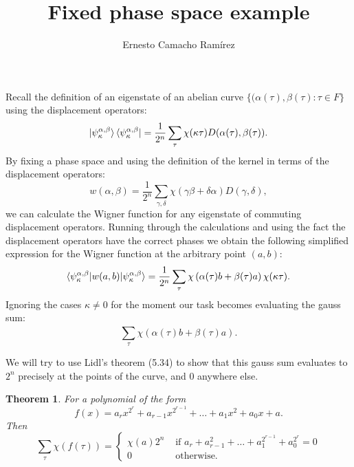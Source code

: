 \documentclass[a4paper]{article}
\title{Fixed phase space example}
\author{Ernesto Camacho Ramírez}
\newtheorem{theorem}{Theorem}
\begin{document}
  \maketitle

  Recall the definition of an eigenstate of an abelian curve
  $\{(\alpha(\tau),\beta(\tau) : \tau \in F\}$ using the
  displacement operators:
  \begin{equation}
    \ket{\psi_\kappa^{\alpha,\beta}}
    \bra{\psi_\kappa^{\alpha,\beta}}
    = \frac{1}{2^{n}}
    \sum_{\tau}^{} \chi(\kappa\tau) 
    D(\alpha(\tau),\beta(\tau)).
  \end{equation}
  By fixing a phase space and using the definition of the
  kernel in terms of the displacement operators:
  \begin{equation}
    w(\alpha,\beta)
    = \frac{1}{2^{n}} \sum_{\gamma,\delta}^{} 
    \chi(\gamma\beta +\delta\alpha) D(\gamma,\delta),
  \end{equation}
  we can calculate the Wigner function for any eigenstate of
  commuting displacement operators.
  Running through the calculations and using the fact the
  displacement operators have the correct phases we obtain
  the following simplified expression for the Wigner
  function at the arbitrary point $(a,b)$:
  \begin{equation}
    \braket{
      \psi_{\kappa}^{\alpha,\beta}|w(a,b)|
      \psi_{\kappa}^{\alpha,\beta}
    }
    = \frac{1}{2^{n}}
    \sum_{\tau}^{} 
    \chi\left( \alpha(\tau)b + \beta(\tau)a \right) 
    \chi(\kappa\tau).
  \end{equation}
  Ignoring the cases $\kappa \neq 0$ for the moment our task
  becomes evaluating the gauss sum:
  \begin{equation}
    \sum_{\tau}^{} 
    \chi\left( \alpha(\tau)b + \beta(\tau)a \right).
  \end{equation}

  We will try to use Lidl's theorem (5.34) to show that this
  gauss sum evaluates to $2^{n}$ precisely at the points of
  the curve, and 0 anywhere else.

  \begin{theorem}
    For a polynomial of the form
    \begin{equation}
      f(x)
      = a_r x^{2^{r}} + a_{r-1}x^{2^{r-1}} + \ldots
      + a_1x^{2} + a_0x + a.
    \end{equation}
    Then 
    \begin{equation}
      \sum_{\tau}^{} 
      \chi(f(\tau))
      = \begin{cases}
        \chi(a) 2^{n} & \text{ if } 
        a_r + a_{r-1}^2 + \ldots + a_1^{2^{r-1}} +
        a_0^{2^{r}} = 0 \\
        0 & \text{ otherwise. }
      \end{cases}
    \end{equation}
  \end{theorem}
\end{document}
